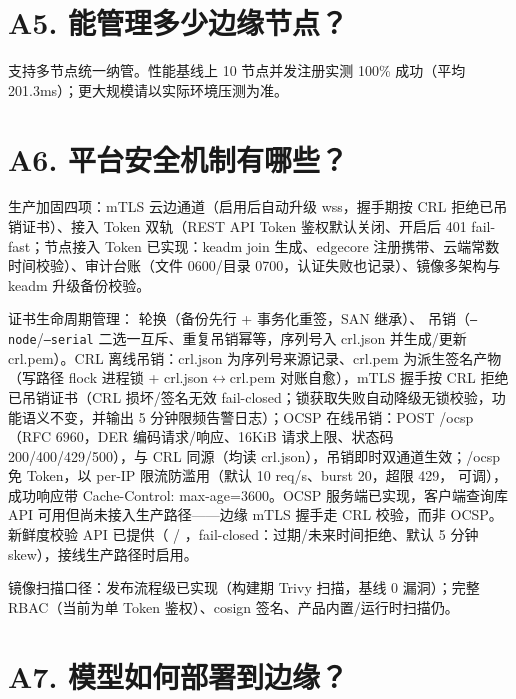 \section*{A5. 能管理多少边缘节点？}

支持多节点统一纳管。性能基线上 10 节点并发注册实测 100\% 成功（平均 201.3ms）；更大规模请以实际环境压测为准。

\section*{A6. 平台安全机制有哪些？}

生产加固四项：mTLS 云边通道（启用后自动升级 wss，握手期按 CRL 拒绝已吊销证书）、接入 Token 双轨（REST API Token 鉴权默认关闭、开启后 401 fail-fast；节点接入 Token 已实现：keadm join 生成、edgecore 注册携带、云端常数时间校验）、审计台账（文件 0600/目录 0700，认证失败也记录）、镜像多架构与 keadm 升级备份校验。

证书生命周期管理： 轮换（备份先行 + 事务化重签，SAN 继承）、 吊销（\texttt{--node}/\texttt{--serial} 二选一互斥、重复吊销幂等，序列号入 crl.json 并生成/更新 crl.pem）。CRL 离线吊销：crl.json 为序列号来源记录、crl.pem 为派生签名产物（写路径 flock 进程锁 + crl.json$\leftrightarrow$crl.pem 对账自愈），mTLS 握手按 CRL 拒绝已吊销证书（CRL 损坏/签名无效 fail-closed；锁获取失败自动降级无锁校验，功能语义不变，并输出 5 分钟限频告警日志）；OCSP 在线吊销：POST /ocsp（RFC 6960，DER 编码请求/响应、16KiB 请求上限、状态码 200/400/429/500），与 CRL 同源（均读 crl.json），吊销即时双通道生效；/ocsp 免 Token，以 per-IP 限流防滥用（默认 10 req/s、burst 20，超限 429， 可调），成功响应带 Cache-Control: max-age=3600。OCSP 服务端已实现，客户端查询库 API 可用但尚未接入生产路径——边缘 mTLS 握手走 CRL 校验，而非 OCSP。新鲜度校验 API 已提供（ / ，fail-closed：过期/未来时间拒绝、默认 5 分钟 skew），接线生产路径时启用。

镜像扫描口径：发布流程级已实现（构建期 Trivy 扫描，基线 0 漏洞）；完整 RBAC（当前为单 Token 鉴权）、cosign 签名、产品内置/运行时扫描仍\warn。

\section*{A7. 模型如何部署到边缘？}

